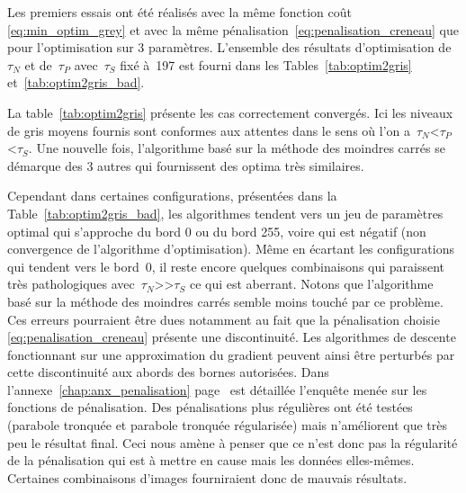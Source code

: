 \documentclass[main.tex]{subfiles}
\begin{document}
Les premiers essais ont été réalisés avec la même fonction coût \eqref{eq:min_optim_grey} et avec la même pénalisation~\eqref{eq:penalisation_creneau} que pour l'optimisation sur 3 paramètres. 
L'ensemble des résultats d'optimisation de~$\tau_N$ et de~$\tau_P$ avec~$\tau_S$ fixé à~197  %
est fourni dans les Tables~\ref{tab:optim2gris} et~\ref{tab:optim2gris_bad}. 


La table~\ref{tab:optim2gris} présente les cas correctement convergés. Ici les niveaux de gris moyens fournis sont conformes aux attentes dans le sens où l'on a~$\tau_N$<$\tau_P$<$\tau_S$.  Une nouvelle fois, l'algorithme basé sur la méthode des moindres carrés se démarque des 3 autres qui fournissent des optima très similaires.


Cependant dans certaines configurations, présentées dans la Table~\ref{tab:optim2gris_bad}, les algorithmes tendent vers un jeu de paramètres optimal qui s'approche du bord 0 ou du bord 255, voire qui est négatif (\ie non convergence de l'algorithme d'optimisation). 
Même en écartant les configurations qui tendent vers le bord~0, il reste encore quelques combinaisons qui paraissent très pathologiques avec~$\tau_N$>>$\tau_S$ ce qui est aberrant. 
Notons que l'algorithme basé sur la méthode des moindres carrés semble moins touché par ce problème. 
Ces erreurs pourraient être dues notamment au fait que la pénalisation choisie \eqref{eq:penalisation_creneau} présente une discontinuité. Les algorithmes de descente fonctionnant sur une approximation du gradient peuvent ainsi être perturbés par cette discontinuité  aux abords des bornes autorisées. Dans l'annexe~\ref{chap:anx_penalisation} page~\pageref{chap:anx_penalisation} est détaillée l'enquête menée sur les fonctions de pénalisation. Des pénalisations plus régulières ont été testées (parabole tronquée et parabole tronquée régularisée) mais n'améliorent que très peu le résultat final. Ceci nous amène à penser que ce n'est donc pas la régularité de la pénalisation qui est à mettre en cause mais les données elles-mêmes. Certaines combinaisons d'images fourniraient donc de mauvais résultats. 
\end{document}
